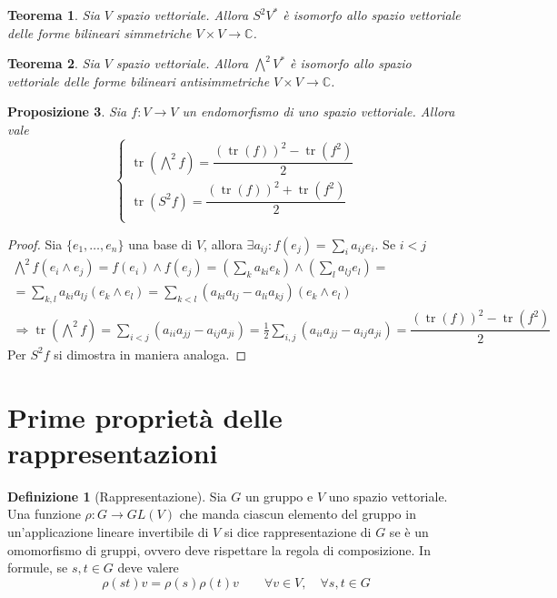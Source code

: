 \documentclass[11pt]{article}
\theoremstyle{plain}
\newtheorem{thm}{Teorema}[section]
\newtheorem{prop}[thm]{Proposizione}
\theoremstyle{definition}
\newtheorem{defn}{Definizione}[section]
\theoremstyle{remark}
\newcommand{\C}{\mathbb{C}}
\DeclareMathOperator{\tr}{tr}
\begin{document}
\begin{thm}
Sia $V$ spazio vettoriale. Allora $S^2V^*$ è isomorfo allo spazio vettoriale delle forme bilineari simmetriche $V\times V\to \C$.
\end{thm}
\begin{thm}
Sia $V$ spazio vettoriale. Allora $\bigwedge^2V^*$ è isomorfo allo spazio vettoriale delle forme bilineari antisimmetriche $V\times V\to \C$.
\end{thm}


\begin{prop}
Sia $f: V \to V$ un endomorfismo di uno spazio vettoriale. Allora vale
\[
\begin{cases}
\tr(\bigwedge^2 f ) = \dfrac{(\tr(f))^2 - \tr(f^2)}{2} \\
\tr(S^2 f ) = \dfrac{(\tr(f))^2 + \tr(f^2)}{2} \\
\end{cases}
\]
\label{thm:tracciasymalt}
\end{prop}


\begin{proof} Sia $\{e_1,\ldots,e_n\}$ una base di $V$, allora $\exists a_{ij}: f(e_j)=\sum_i a_{ij}e_i$. Se $i<j$
\begin{gather*}
\bigwedge^2f(e_i\wedge e_j)=f(e_i)\wedge f(e_j)=\left(\sum_k a_{ki}e_k\right)\wedge\left(\sum_l a_{lj}e_l\right)=\\
=\sum_{k,l}a_{ki}a_{lj}(e_k\wedge e_l)=\sum_{k<l}(a_{ki}a_{lj}-a_{li}a_{kj})(e_k\wedge e_l)\\
\Rightarrow \tr(\bigwedge^2f)=\sum_{i<j}(a_{ii}a_{jj}-a_{ij}a_{ji})=\frac{1}{2}\sum_{i,j}(a_{ii}a_{jj}-a_{ij}a_{ji})= \dfrac{(\tr(f))^2 - \tr(f^2)}{2}
\end{gather*}
Per $S^2f$ si dimostra in maniera analoga.

\end{proof}













\newpage
\section{Prime proprietà delle rappresentazioni}

\begin{defn}[Rappresentazione]
	Sia $G$ un gruppo e $V$ uno spazio vettoriale. Una funzione $\rho: G \to GL(V)$ che manda ciascun elemento del gruppo in un'applicazione lineare invertibile di $V$
	si dice rappresentazione di $G$ se è un omomorfismo di gruppi, ovvero deve rispettare la regola di composizione. In formule, se $s, t \in G$ deve valere
	\[ \rho(st) v = \rho(s)\rho(t) v \qquad \forall v \in V, \quad \forall s,t \in G\]
\end{defn}
\end{document}
